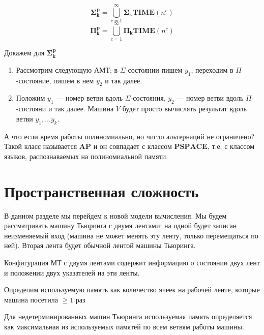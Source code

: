 \begin{proposition}
    \[\mathbf{\Sigma_k^p} = \bigcup_{c = 1}^\infty \mathbf{\Sigma_kTIME}(n^c)\]
    \[\mathbf{\Pi_k^p} = \bigcup_{c = 1}^\infty \mathbf{\Pi_kTIME}(n^c)\]
\end{proposition}
\begin{proposition}
    Докажем для \(\mathbf{\Sigma_k^p}\)
    \begin{enumerate}
        \item[\(\subset\)] Рассмотрим следующую АМТ: в \(\Sigma\)-состоянии пишем \(y_1\), переходим в \(\Pi\)-состояние, пишем в нем \(y_2\) и так далее.
        \item[\(\supset\)] Положим \(y_1\) --- номер ветви вдоль \(\Sigma\)-состояния, \(y_2\) --- номер ветви вдоль \(\Pi\)-состояни и так далее. Машина \(V\) будет просто вычислять результат вдоль ветви \(y_1, \dots y_k\).
    \end{enumerate}
\end{proposition}

А что если время работы полиномиально, но число альтернаций не ограничено? Такой класс называется \(\mathbf{AP}\) и он совпадает с классом \(\mathbf{PSPACE}\), т.е. с классом языков, распознаваемых на полиномиальной памяти. 


\section{Пространственная сложность}

В данном разделе мы перейдем к новой модели вычисления. Мы будем рассматривать машину Тьюринга с двумя лентами: на одной будет записан неизменяемый вход (машина не может менять эту ленту, только перемещаться по ней). Вторая лента будет обычной лентой машины Тьюринга. 

\begin{note}
    Конфигурация МТ с двумя лентами содержит информацию о состоянии двух лент и положении двух указателей на эти ленты.
\end{note}

\begin{definition}
    Определим используемую память как количество ячеек на рабочей ленте, которые машина посетила \(\ge 1\) раз
\end{definition}

\begin{note}
    Для недетерминированных машин Тьюринга используемая память определяется как максимальная из используемых памятей по всем ветвям работы машины.
\end{note}

